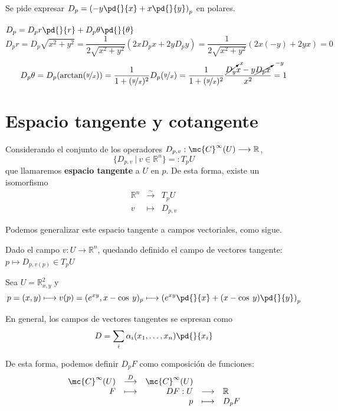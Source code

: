 \begin{eje}
    Se pide expresar $D_p=\left( -y \pd{}{x} + x \pd{}{y}\right)_p$ en polares. 
\end{eje}
\begin{sol}
$D_p=D_pr \pd{}{r} + D_p \theta \pd{}{\theta}$
$$D_pr=D_p \sqrt{x^2+y^2}=\dfrac{1}{2\sqrt{x^2+y^2}}(2x D_px+2yD_py)=\dfrac{1}{2\sqrt{x^2+y^2}}(2x(-y)+2yx)=0$$
$$D_p \theta = D_p(\arctan(\nicefrac{y}{x}))=\dfrac{1}{1+(\nicefrac{y}{x})^2}D_p(\nicefrac{y}{x})=\dfrac{1}{1+(\nicefrac{y}{x})^2} \dfrac{\cancelto{x}{D_y} x - y \cancelto{-y}{D_px}}{x^2}=1$$
\end{sol}
\section{Espacio tangente y cotangente}
\begin{defi}
    Considerando el conjunto de los operadores $D_{p,v}: \mc{C}^{\infty}(U) \longrightarrow \mathbb{R}$, 
    $$\{D_{p,v} \: | \: v \in \mathbb{R}^n\}=: T_pU$$
    que llamaremos \textbf{espacio tangente} a $U$ en $p$.
    De esta forma, existe un isomorfismo
    $$\begin{array}{rcl}
         \mathbb{R}^n & \overset{\sim}{\longrightarrow} & T_pU  \\
         v & \longmapsto & D_{p,v}  
    \end{array}$$
\end{defi}
Podemos generalizar este espacio tangente a campos vectoriales, como sigue.
\begin{defi}
    Dado el campo $v: U \longrightarrow \mathbb{R}^n$, quedando definido el campo de vectores tangente: $p \longmapsto D_{p, v(p)} \in T_pU$
\end{defi}
\begin{eje}
    Sea $U=\mathbb{R}_{x,y}^2$ y $$p=(x,y) \longmapsto v(p)=(e^{xy}, x-\cos \: y)_p \longmapsto \left(e^{xy} \pd{}{x} + (x-\cos \: y) \pd{}{y}\right)_p $$
\end{eje}
\begin{obs}
    En general, los campos de vectores tangentes se espresan como 
    $$D=\sum_{i} \alpha_i(x_1, \ldots, x_n) \pd{}{x_i}$$
\end{obs}
\begin{nota}
    De esta forma, podemos definir $D_pF$ como composición de funciones:
    $$\begin{array}{rrrll}
         \mc{C}^{\infty}(U) & \overset{D}{\longrightarrow} & \mc{C}^{\infty}(U)    \\
         F & \longmapsto & DF:U & \longrightarrow & \mathbb{R} \\
         & & p & \longmapsto & D_pF
    \end{array}$$
\end{nota}
